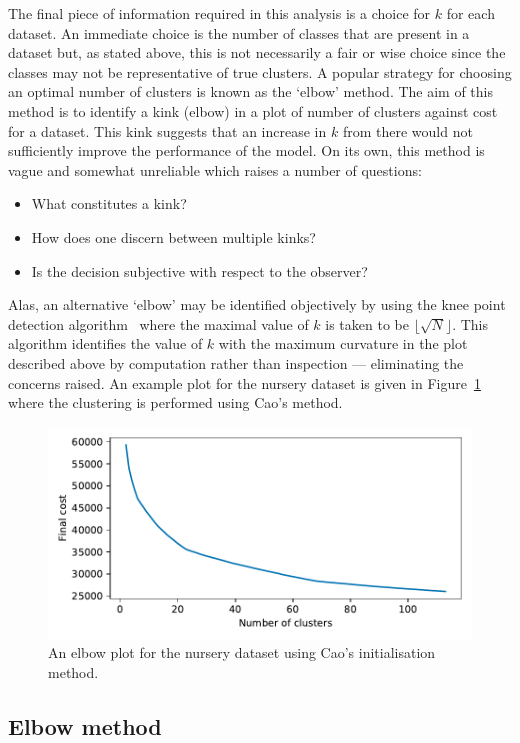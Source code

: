 The final piece of information required in this analysis is a choice for \(k\)
for each dataset. An immediate choice is the number of classes that are present
in a dataset but, as stated above, this is not necessarily a fair or wise choice
since the classes may not be representative of true clusters. A popular strategy
for choosing an optimal number of clusters is known as the `elbow' method. The
aim of this method is to identify a kink (elbow) in a plot of number of clusters
against cost for a dataset. This kink suggests that an increase in \(k\) from
there would not sufficiently improve the performance of the model. On its own,
this method is vague and somewhat unreliable which raises a number of questions:
\begin{itemize}
    \item What constitutes a kink?
    \item How does one discern between multiple kinks?
    \item Is the decision subjective with respect to the observer?
\end{itemize}

Alas, an alternative `elbow' may be identified objectively by using
the knee point detection algorithm~\cite{Satopaa2011} where the maximal
value of \(k\) is taken to be \(\lfloor\sqrt{N}\rfloor\). This algorithm
identifies the value of \(k\) with the maximum curvature in the plot described
above by computation rather than inspection --- eliminating the concerns raised.
An example plot for the nursery dataset is given in
Figure~\ref{fig:nursery_costs} where the clustering is performed using Cao's
method.

\begin{figure}
    \centering
    \includegraphics[width=.6\linewidth]{./img/elbow/nursery_costs.pdf}
    \caption{An elbow plot for the nursery dataset using Cao's initialisation
             method.}\label{fig:nursery_costs}
\end{figure}

\subsection{Elbow method}

